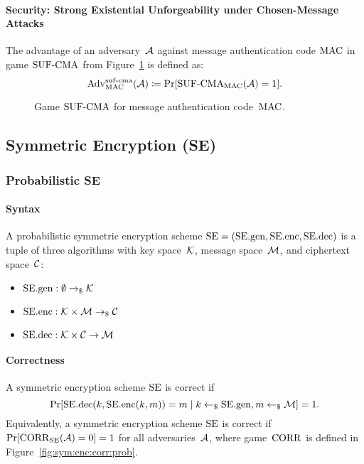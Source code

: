 \documentclass[a4paper,orivec]{llncs}
\begin{document}
\paragraph{Security: Strong Existential Unforgeability under Chosen-Message Attacks}
The advantage of an adversary~$\mathcal{A}$ against message authentication code $\mathrm{MAC}$ in game ${\mathrm{SUF}\text{-}\mathrm{CMA}}$ from Figure~\ref{fig:mac:suf} is defined as:
\[
\mathrm{Adv}_{\mathrm{MAC}}^{\mathrm{suf}\text{-}\mathrm{cma}}(\mathcal{A})\coloneqq\Pr[{\mathrm{SUF}\text{-}\mathrm{CMA}}_{\mathrm{MAC}}(\mathcal{A})=1]\text{.}
\]

\begin{figure}[!ht]
    \centering
    \nicoresetlinenr%
    \fbox{%
        \scalebox{\codescalefactor}{%
        }%
    }
    \caption{%
        Game ${\mathrm{SUF}\text{-}\mathrm{CMA}}$ for message authentication code~$\mathrm{MAC}$.
    }
    \label{fig:mac:suf}
\end{figure}


\subsection{Symmetric Encryption (SE)}

\subsubsection{Probabilistic SE}

\paragraph{Syntax}
A probabilistic symmetric encryption scheme $\mathrm{SE}=(\mathrm{SE}.\mathrm{gen},\mathrm{SE}.\mathrm{enc},\mathrm{SE}.\mathrm{dec})$ is a tuple of three algorithms with key space~$\mathcal{K}$, message space~$\mathcal{M}$, and ciphertext space~$\mathcal{C}$:

\begin{itemize}
    \item $\mathrm{SE}.\mathrm{gen}: \emptyset \to_\$ \mathcal{K}$
    \item $\mathrm{SE}.\mathrm{enc}: \mathcal{K}\times\mathcal{M} \to_\$ \mathcal{C}$
    \item $\mathrm{SE}.\mathrm{dec}: \mathcal{K}\times\mathcal{C} \to \mathcal{M}$
\end{itemize}

\paragraph{Correctness}
A symmetric encryption scheme $\mathrm{SE}$ is correct if 
\[
\Pr[\mathrm{SE}.\mathrm{dec}(k,\mathrm{SE}.\mathrm{enc}(k,m))=m\mid k\gets_\$\mathrm{SE}.\mathrm{gen},m\gets_\$\mathcal{M}]=1\text{.}
\]
Equivalently, a symmetric encryption scheme $\mathrm{SE}$ is correct if $\Pr[\mathrm{CORR}_{\mathrm{SE}}(\mathcal{A})=0]=1$ for all adversaries~$\mathcal{A}$, where game~$\mathrm{CORR}$ is defined in Figure~\ref{fig:sym:enc:corr:prob}.
\end{document}
